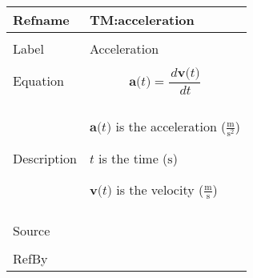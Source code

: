 \documentclass[12pt]{article}
\begin{document}
\vspace{\baselineskip}
\noindent
\begin{minipage}{\textwidth}
\begin{tabular}{>{\raggedright}p{}>{\raggedright\arraybackslash}p{}}
\toprule \textbf{Refname} & \textbf{TM:acceleration}
\label{TM:acceleration}
\\ \midrule \\
Label & Acceleration
        
\\ \midrule \\
Equation & \begin{displaymath}
           \symbf{a}\text{(}t\text{)}=\frac{\,d\symbf{v}\text{(}t\text{)}}{\,dt}
           \end{displaymath}
\\ \midrule \\
Description & \begin{symbDescription}
              \item{$\symbf{a}\text{(}t\text{)}$ is the acceleration ($\frac{\text{m}}{\text{s}^{2}}$)}
              \item{$t$ is the time (${\text{s}}$)}
              \item{$\symbf{v}\text{(}t\text{)}$ is the velocity ($\frac{\text{m}}{\text{s}}$)}
              \end{symbDescription}
\\ \midrule \\
Source & \cite{accelerationWiki}
         
\\ \midrule \\
RefBy & 
\\ \bottomrule
\end{tabular}
\end{minipage}
\vspace{\baselineskip}
\noindent
\end{document}
